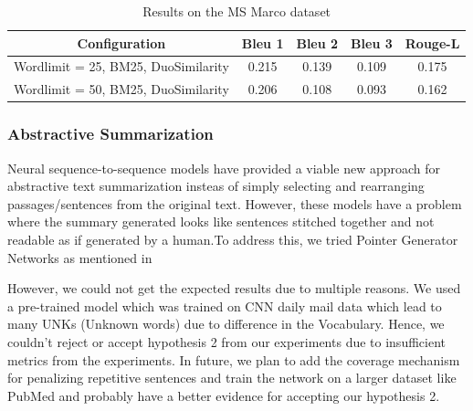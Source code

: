 \begin{table}[t]
    \centering
    \begin{tabular}{|c|c|c|c|c|} \hline
    \textbf{Configuration} & \textbf{Bleu 1} & \textbf{Bleu 2} & \textbf{Bleu 3} & \textbf{Rouge-L} \\
    \hline
      Wordlimit = 25, BM25, DuoSimilarity & 0.215 & 0.139 & 0.109 & 0.175\\
     \hline
     Wordlimit = 50, BM25, DuoSimilarity &  0.206 & 0.108 & 0.093 & 0.162\\
    \hline
    \end{tabular}
    \caption{Results on the MS Marco dataset}
    \label{tab:ms_marco_ext_res}
\end{table}

\subsubsection{Abstractive Summarization}
Neural sequence-to-sequence models have provided a viable new approach for abstractive text summarization insteas of simply selecting and rearranging passages/sentences from the original text. However, these models have a problem where the summary generated looks like sentences stitched together and not readable as if generated by a human.To address this, we tried Pointer Generator Networks as mentioned in \cite{PGC}

However, we could not get the expected results due to multiple reasons. We used a pre-trained model which was trained on CNN daily mail data which lead to many UNKs (Unknown words) due to difference in the Vocabulary. Hence, we couldn't reject or accept hypothesis 2 from our experiments due to insufficient metrics from the experiments. In future, we plan to add the coverage mechanism for penalizing repetitive sentences and train the network on a larger dataset like PubMed and probably have a better evidence for accepting our hypothesis 2. 

